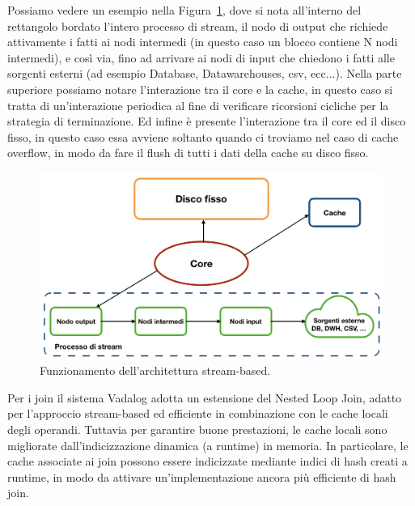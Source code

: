 Possiamo vedere un esempio nella Figura~\ref{fig:architettura_1}, dove si nota all'interno del rettangolo bordato l'intero processo di stream, il nodo di output che richiede attivamente i fatti ai nodi intermedi (in questo caso un blocco contiene N nodi intermedi), e così via, fino ad arrivare ai nodi di input che chiedono i fatti alle sorgenti esterni (ad esempio Database, Datawarehouses, csv, ecc...). \newline
Nella parte superiore possiamo notare l'interazione tra il core e la cache, in questo caso si tratta di un'interazione periodica al fine di verificare ricorsioni cicliche per la strategia di terminazione. \newline
Ed infine è presente l'interazione tra il core ed il disco fisso, in questo caso essa avviene soltanto quando ci troviamo nel caso di cache overflow, in modo da fare il flush di tutti i dati della cache su disco fisso.\newpage \clearpage

\begin{figure}[h!]
	\centering
	\includegraphics[width=0.8\linewidth]{figure/architettura-1}
	\caption{Funzionamento dell'architettura stream-based.}
	\label{fig:architettura_1}
\end{figure}

Per i join il sistema Vadalog adotta un estensione del Nested Loop Join, adatto per l'approccio stream-based ed efficiente in combinazione con le cache locali degli operandi. \newline
Tuttavia per garantire buone prestazioni, le cache locali sono migliorate dall'indicizzazione dinamica (a runtime) in memoria. In particolare, le cache associate ai join possono essere indicizzate mediante indici di hash creati a runtime, in modo da attivare un'implementazione ancora più efficiente di hash join.